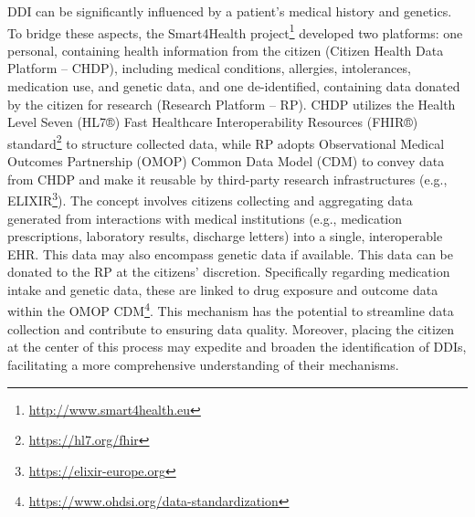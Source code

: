 \documentclass[unnumsec,webpdf,contemporary,large]{oup-authoring-template}%
\theoremstyle{thmstyleone}%
\theoremstyle{thmstyletwo}%
\theoremstyle{thmstylethree}%
\begin{document}
DDI can be significantly influenced by a patient’s medical history and genetics. To bridge these aspects, the Smart4Health project\footnote{\url{http://www.smart4health.eu}} developed two platforms: one personal, containing health information from the citizen (Citizen Health Data Platform – CHDP), including medical conditions, allergies, intolerances, medication use, and genetic data, and one de-identified, containing data donated by the citizen for research (Research Platform – RP). CHDP utilizes the Health Level Seven (HL7®) Fast Healthcare Interoperability Resources (FHIR®) standard\footnote{\url{ https://hl7.org/fhir}} to structure collected data, while RP adopts Observational Medical Outcomes Partnership (OMOP) Common Data Model (CDM) to convey data from CHDP and make it reusable by third-party research infrastructures (e.g., ELIXIR\footnote{\url{https://elixir-europe.org}}). The concept involves citizens collecting and aggregating data generated from interactions with medical institutions (e.g., medication prescriptions, laboratory results, discharge letters) into a single, interoperable EHR. This data may also encompass genetic data if available. This data can be donated to the RP at the citizens' discretion. Specifically regarding medication intake and genetic data, these are linked to drug exposure and outcome data within the OMOP CDM\footnote{\url{https://www.ohdsi.org/data-standardization}}. This mechanism has the potential to streamline data collection and contribute to ensuring data quality. Moreover, placing the citizen at the center of this process may expedite and broaden the identification of DDIs, facilitating a more comprehensive understanding of their mechanisms.
\end{document}
